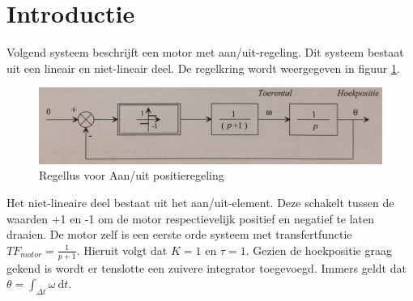 \documentclass[12pt]{article}
\begin{document}
\section{Introductie}
Volgend systeem beschrijft een motor met aan/uit-regeling. Dit systeem bestaat uit een lineair en niet-lineair deel. De regelkring wordt weergegeven in figuur \ref{regellus}.
\begin{figure}[!h]
	\centering
	\includegraphics[width=\textwidth, keepaspectratio]{regellus.png}
	\caption{Regellus voor Aan/uit positieregeling}
	\label{regellus}	
\end{figure}

\noindent
Het niet-lineaire deel bestaat uit het aan/uit-element. Deze schakelt tussen de waarden +1 en -1 om de motor respectievelijk positief en negatief te laten draaien. De motor zelf is een eerste orde systeem met transfertfunctie $TF_{motor} = \frac{1}{p+1}$. Hieruit volgt dat $K=1$ en $\tau=1$. Gezien de hoekpositie graag gekend is wordt er tenslotte een zuivere integrator toegevoegd. Immers geldt dat $\theta = \int_{\Delta t} \omega \ \mathrm{d}t$. \\ \\
\end{document}
